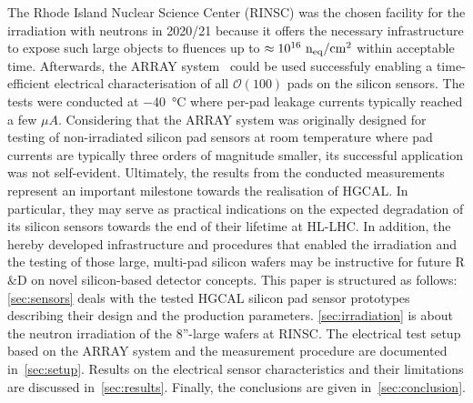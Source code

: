 The Rhode Island Nuclear Science Center (RINSC) was the chosen facility for the irradiation with neutrons in 2020/21 because it offers the necessary infrastructure to expose such large objects to fluences up to $\approx 10^{16}~\mathrm{n_{eq}}/\mathrm{cm}^{2}$ within acceptable time.
Afterwards, the ARRAY system~\cite{pitters:array2019} could be used successfuly enabling a time-efficient electrical characterisation of all $\mathcal{O}(100)$ pads on the silicon sensors.
The tests were conducted at \SI{-40}{\celsius} where per-pad leakage currents typically reached a few $\mu A$.
Considering that the ARRAY system was originally designed for testing of non-irradiated silicon pad sensors at room temperature where pad currents are typically three orders of magnitude smaller, its successful application was not self-evident.\newline
Ultimately, the results from the conducted measurements represent an important milestone towards the realisation of HGCAL.
In particular, they may serve as practical indications on the expected degradation of its silicon sensors towards the end of their lifetime at HL-LHC. 
In addition, the hereby developed infrastructure and procedures that enabled the irradiation and the testing of those large, multi-pad silicon wafers may be instructive for future R$\&$D on novel silicon-based detector concepts.\newline
This paper is structured as follows:
\ref{sec:sensors} deals with the tested HGCAL silicon pad sensor prototypes describing their design and the production parameters.
\ref{sec:irradiation} is about the neutron irradiation of the 8''-large wafers at RINSC. 
The electrical test setup based on the ARRAY system and the measurement procedure are documented in~\ref{sec:setup}.
Results on the electrical sensor characteristics and their limitations are discussed in~\ref{sec:results}.
Finally, the conclusions are given in~\ref{sec:conclusion}.